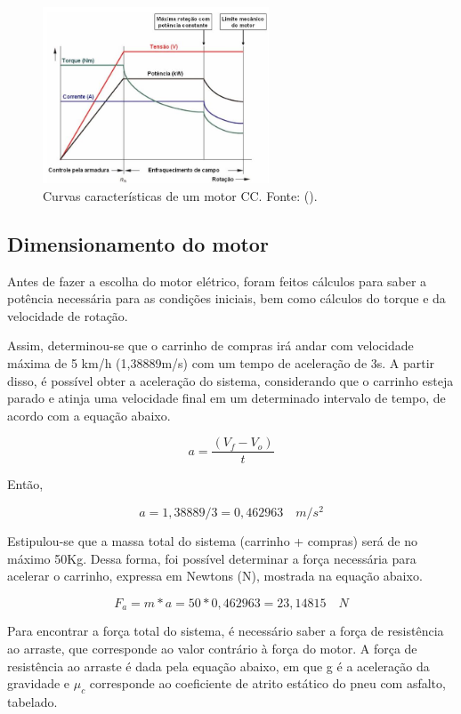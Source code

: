 \begin{figure}[ht]
		\centering
		\includegraphics[width=0.6\textwidth]{figuras/curvamotorcc.JPG}
		\caption{Curvas características de um motor CC.  Fonte: \citeauthor{prentice} (\citeyear{prentice}).}
		\label{fig:curvas_motor}
\end{figure} 


\subsection{Dimensionamento do motor}
\par Antes de fazer a escolha do motor elétrico, foram feitos cálculos para saber a potência necessária para as condições iniciais, bem como cálculos do torque e da velocidade de rotação. 
\par Assim, determinou-se que o carrinho de compras irá andar com velocidade máxima de 5 km/h (1,38889m/s) com um tempo de aceleração de 3s. A partir disso, é possível obter a aceleração do sistema, considerando que o carrinho esteja parado e atinja uma velocidade final em um determinado intervalo de tempo, de acordo com a equação abaixo.

$$ a=  \frac{(V_f-V_o)}{t}   $$ 

\par Então,

$$ a =  1,38889/3 = 0,462963 \quad m/s^2 $$ 

\par Estipulou-se que a massa total do sistema (carrinho + compras) será de no máximo 50Kg. Dessa forma, foi possível determinar a força necessária para acelerar o carrinho, expressa em Newtons (N), mostrada na equação abaixo.

$$ F_a = m*a = 50*0,462963 = 23,14815 \quad N $$

\par Para encontrar a força total do sistema, é necessário saber a força de resistência ao arraste, que corresponde ao valor contrário à força do motor. A força de resistência ao arraste é dada pela equação abaixo, em que g é a aceleração da gravidade e $\mu_c$ corresponde ao coeficiente de atrito estático do pneu com asfalto, tabelado.

